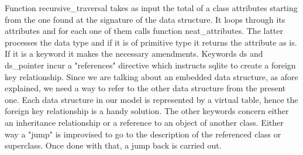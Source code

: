 \documentclass[pdftex, 11pt, a4paper]{report}
\begin{document}
\par
Function recursive\_traversal takes as input the total of a class attributes starting from the one found at the signature of the data structure. It loops through its attributes and for each one of them calls function neat\_attributes. The latter processes the data type and if it is of primitive type it returns the attribute as is. If it is a keyword it makes the necessary amendments. Keywords ds and ds\_pointer incur a "references" directive which instructs sqlite to create a foreign key relationship. Since we are talking about an embedded data structure, as afore explained, we need a way to refer to the other data structure from the present one. Each data structure in our model is represented by a virtual table, hence the foreign key relationship is a handy solution. The other keywords concern either an inheritance relationship or a reference to an object of another class. Either way a "jump" is improvised to go to the description of the referenced class or superclass. Once done with that, a jump back is carried out. 
\end{document}
